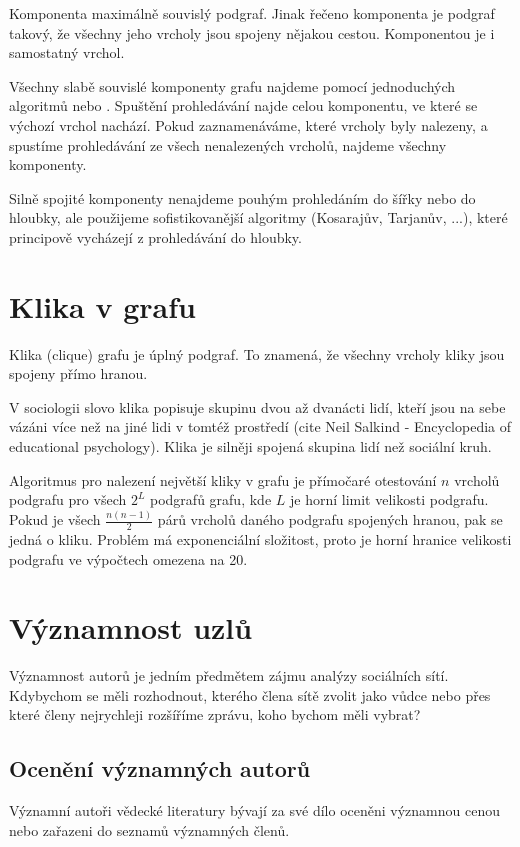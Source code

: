 \documentclass{bakalarka}
\begin{document}
Komponenta maximálně souvislý podgraf. Jinak řečeno komponenta je podgraf
takový, že všechny jeho vrcholy jsou spojeny nějakou cestou. Komponentou je i
samostatný vrchol.

Všechny slabě souvislé komponenty grafu najdeme pomocí jednoduchých algoritmů
 nebo . Spuštění prohledávání najde
celou komponentu, ve které se výchozí vrchol nachází. Pokud zaznamenáváme,
které vrcholy byly nalezeny, a spustíme prohledávání ze všech nenalezených
vrcholů, najdeme všechny komponenty. 

Silně spojité komponenty nenajdeme pouhým prohledáním do šířky nebo do hloubky,
ale použijeme sofistikovanější algoritmy (Kosarajův, Tarjanův, ...), které
principově vycházejí z prohledávání do hloubky.

\section{Klika v grafu}
Klika (clique) grafu je úplný podgraf. To znamená, že všechny vrcholy kliky
jsou spojeny přímo hranou.

V sociologii slovo klika popisuje skupinu dvou až dvanácti lidí, kteří jsou na
sebe vázáni více než na jiné lidi v tomtéž prostředí (cite Neil Salkind -
Encyclopedia of educational psychology). Klika je silněji spojená skupina lidí
než sociální kruh.

Algoritmus pro nalezení největší kliky v grafu je přímočaré otestování $n$
vrcholů podgrafu pro všech $2^L$ podgrafů grafu, kde $L$ je horní limit
velikosti podgrafu. Pokud je všech $\frac{n(n - 1)}{2}$ párů vrcholů daného
podgrafu spojených hranou, pak se jedná o kliku. Problém má exponenciální
složitost, proto je horní hranice velikosti podgrafu ve výpočtech omezena na
20.

\section{Významnost uzlů}
Významnost autorů je jedním předmětem zájmu analýzy sociálních sítí. Kdybychom
se měli rozhodnout, kterého člena sítě zvolit jako vůdce nebo přes které členy
nejrychleji rozšíříme zprávu, koho bychom měli vybrat? 

\subsection{Ocenění významných autorů}
Významní autoři vědecké literatury bývají za své dílo oceněni významnou cenou
nebo zařazeni do seznamů významných členů.
\end{document}

